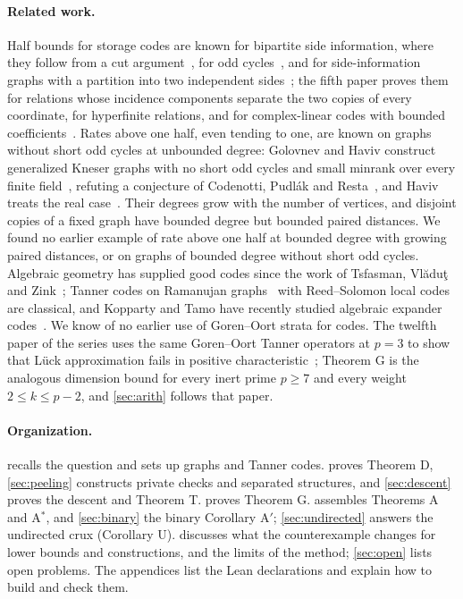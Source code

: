 \paragraph{Related work.} Half bounds for storage codes are known for bipartite side information, where they follow from a
cut argument~\cite{ChristofidesMarkstrom2011,Mazumdar2015}, for odd cycles~\cite{AtkinsRombachSkerman2017}, and for
side-information graphs with a partition into two independent sides~\cite[Theorem~9]{MazumdarMcGregorVorotnikova2019}; the
fifth paper proves them for relations whose incidence components separate the two copies of every coordinate, for
hyperfinite relations, and for complex-linear codes with bounded coefficients~\cite{DirectedRecovery2026}. Rates above one
half, even tending to one, are known on graphs without short odd cycles at unbounded degree: Golovnev and Haviv construct
generalized Kneser graphs with no short odd cycles and small minrank over every finite field~\cite[Theorem~1.10]{GolovnevHaviv2022},
refuting a conjecture of Codenotti, Pudl\'ak and Resta~\cite{CodenottiPudlakResta2000}, and Haviv treats the real
case~\cite{Haviv2019}. Their degrees grow with the number of vertices, and disjoint copies of a fixed graph have bounded
degree but bounded paired distances. We found no earlier example of rate above one half at bounded degree with growing
paired distances, or on graphs of bounded degree without short odd cycles. Algebraic geometry has supplied good codes since the work of Tsfasman, Vl\u{a}du\c{t} and
Zink~\cite{TsfasmanVladutZink1982}; Tanner codes on Ramanujan graphs~\cite{LPS1988} with Reed--Solomon local codes are
classical, and Kopparty and Tamo have recently studied algebraic expander codes~\cite{KoppartyTamo2026}. We know of no
earlier use of Goren--Oort strata for codes. The twelfth paper of the series uses the same Goren--Oort Tanner operators at
$p=3$ to show that L\"uck approximation fails in positive characteristic~\cite{Luck2026}; Theorem G is the analogous
dimension bound for every inert prime $p\ge7$ and every weight $2\le k\le p-2$, and \cref{sec:arith} follows that
paper.

\paragraph{Organization.}  recalls the question and sets up graphs and Tanner codes. 
proves Theorem D, \cref{sec:peeling} constructs private checks and separated structures, and \cref{sec:descent} proves the
descent and Theorem T.  proves Theorem G.  assembles Theorems A and A$^*$, and
\cref{sec:binary} the binary Corollary A$'$; \cref{sec:undirected} answers the undirected crux (Corollary U).
 discusses what the counterexample changes for lower bounds
and constructions, and the limits of the method; \cref{sec:open} lists open problems. The appendices list the Lean
declarations and explain how to build and check them.
